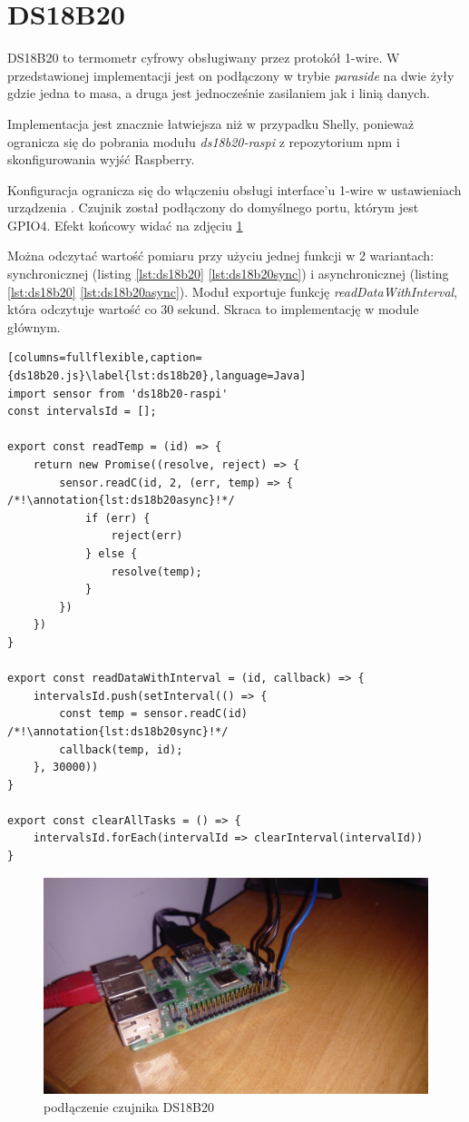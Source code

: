 \section{DS18B20}
DS18B20 to termometr cyfrowy obsługiwany przez protokół 1-wire. W przedstawionej implementacji jest on podłączony w trybie \textit{paraside} na dwie żyły gdzie jedna to masa, a druga jest jednocześnie zasilaniem jak i linią danych. 
\par Implementacja jest znacznie łatwiejsza niż w przypadku Shelly, ponieważ ogranicza się do pobrania modułu \textit{ds18b20-raspi} z repozytorium npm i skonfigurowania wyjść Raspberry. \par
Konfiguracja ogranicza się do włączeniu obsługi interface'u 1-wire w ustawieniach urządzenia \cite{linux}. Czujnik został podłączony do domyślnego portu, którym jest GPIO4. Efekt końcowy widać na zdjęciu \ref{fig:finalGPIOConnections}
\par Można odczytać wartość pomiaru przy użyciu jednej funkcji w 2 wariantach: synchronicznej
(listing \ref{lst:ds18b20} \ref{lst:ds18b20sync}) i asynchronicznej (listing \ref{lst:ds18b20} \ref{lst:ds18b20async}). Moduł exportuje funkcję \textit{readDataWithInterval}, która odczytuje wartość co 30 sekund. Skraca to implementację w module głównym.
\newpage
\begin{lstlisting}[columns=fullflexible,caption={ds18b20.js}\label{lst:ds18b20},language=Java]
import sensor from 'ds18b20-raspi'
const intervalsId = [];

export const readTemp = (id) => {
    return new Promise((resolve, reject) => {
        sensor.readC(id, 2, (err, temp) => { /*!\annotation{lst:ds18b20async}!*/
            if (err) {
                reject(err)
            } else {
                resolve(temp);
            }
        })
    })
}

export const readDataWithInterval = (id, callback) => {
    intervalsId.push(setInterval(() => {
        const temp = sensor.readC(id) /*!\annotation{lst:ds18b20sync}!*/
        callback(temp, id);
    }, 30000))
}

export const clearAllTasks = () => {
    intervalsId.forEach(intervalId => clearInterval(intervalId))
}
\end{lstlisting}
\begin{figure}[h]
  \includegraphics[width=\linewidth]{gpio.jpg}
  \caption{podłączenie czujnika DS18B20}
  \label{fig:finalGPIOConnections}
\end{figure}